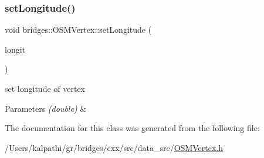 \subsubsection{\texorpdfstring{setLongitude()}{setLongitude()}}
{\footnotesize\ttfamily void bridges\+::\+O\+S\+M\+Vertex\+::set\+Longitude (\begin{DoxyParamCaption}\item[{double}]{longit }\end{DoxyParamCaption})\hspace{0.3cm}{\ttfamily [inline]}}

set longitude of vertex


\begin{DoxyParams}{Parameters}
{\em (double)} & \\
\hline
\end{DoxyParams}


The documentation for this class was generated from the following file\+:\begin{DoxyCompactItemize}
\item 
/\+Users/kalpathi/gr/bridges/cxx/src/data\+\_\+src/\mbox{\hyperlink{_o_s_m_vertex_8h}{O\+S\+M\+Vertex.\+h}}\end{DoxyCompactItemize}
